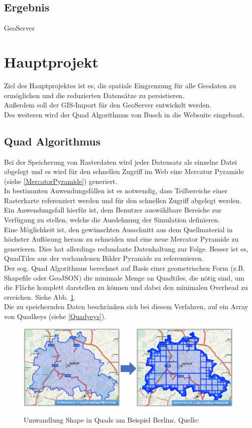 \documentclass[10pt,conference,compsocconf]{IEEEtran}
\begin{document}
\subsection{Ergebnis}
GeoServer



\section{Hauptprojekt}
Ziel des Hauptprojektes ist es, die spatiale Eingrenzung für alle Geodaten zu ermöglichen und die reduzierten Datensätze zu persistieren.\\
Außerdem soll der GIS-Import für den GeoServer entwickelt werden.\\
Des weiteren wird der Quad Algorithmus von Busch\cite{JanBusch} in die Websuite eingebaut.\\

\subsection{Quad Algorithmus}
Bei der Speicherung von Rasterdaten wird jeder Datensatz als einzelne Datei abgelegt und es wird für den schnellen Zugriff im Web eine Mercatur Pyramide (siehe \ref{MercatorPyramide}) generiert.\\
In bestimmten Anwendungsfällen ist es notwendig, dass Teilbereiche einer Rasterkarte referenziert werden und für den schnellen Zugriff abgelegt werden. Ein Anwendungsfall hierfür ist, dem Benutzer auswählbare Bereiche zur Verfügung zu stellen, welche die Ausdehnung der Simulation definieren.\\
\indent Eine Möglichkeit ist, den gewünschten Ausschnitt aus dem Quellmaterial in höchster Auflösung heraus zu schneiden und eine neue Mercator Pyramide zu generieren. Dies hat allerdings redundante Datenhaltung zur Folge. Besser ist es, QuadTiles aus der vorhandenen Bilder Pyramide zu referenzieren.\\
Der sog. Quad Algorithmus\cite{JanBusch} berechnet auf Basis einer geometrischen Form (z.B. Shapefile oder GeoJSON) die minimale Menge an Quadtiles, die nötig sind, um die Fläche komplett darstellen zu können und dabei den minimalen Overhead zu erreichen. Siehe Abb. \ref{img:shape2quads}.\\
Die zu speichernden Daten beschränken sich bei diesem Verfahren, auf ein Array von Quadkeys (siehe \ref{Quadyeys}).

\begin{figure}[H]
	\centering
	\includegraphics[width=1\columnwidth]{img/shape2quads.png} \\
	\caption[]{Umwandlung Shape in Quads am Beispiel Berlins. Quelle: \cite{JanBusch}}
	\label{img:shape2quads}
\end{figure}
\end{document}
